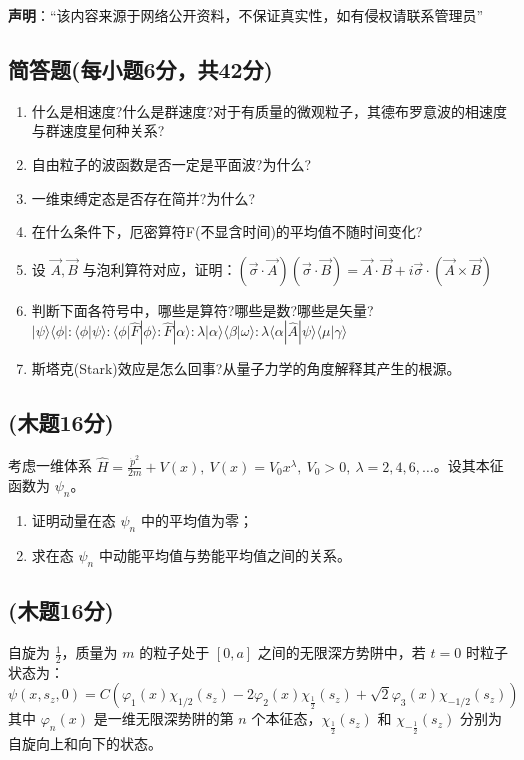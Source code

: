 
\textbf{声明}：“该内容来源于网络公开资料，不保证真实性，如有侵权请联系管理员”

\subsection{简答题(每小题6分，共42分)}
\begin{enumerate}
\item 什么是相速度?什么是群速度?对于有质量的微观粒子，其德布罗意波的相速度与群速度星何种关系?
\item 自由粒子的波函数是否一定是平面波?为什么?
\item 一维束缚定态是否存在简并?为什么?
\item 在什么条件下，厄密算符F(不显含时间)的平均值不随时间变化?
\item 设 $\vec{A}, \vec{B}$ 与泡利算符对应，证明：$\left( \vec{\sigma} \cdot \vec{A} \right) \left( \vec{\sigma} \cdot \vec{B} \right) = \vec{A} \cdot \vec{B} + i \vec{\sigma} \cdot \left( \vec{A} \times \vec{B} \right)$
\item 判断下面各符号中，哪些是算符?哪些是数?哪些是矢量?
$|\psi\rangle\langle\phi| : \langle\phi|\psi\rangle : \langle\phi|\hat{F}|\phi\rangle : \hat{F}|\alpha\rangle : \lambda |\alpha\rangle\langle\beta|\omega\rangle : \lambda \langle\alpha|\hat{A}|\psi\rangle\langle\mu|\gamma\rangle$
\item 斯塔克(Stark)效应是怎么回事?从量子力学的角度解释其产生的根源。
\end{enumerate}
\subsection{(木题16分)}
考虑一维体系 $\hat H = \frac{\dot p^2}{2m} + V(x),\ V(x) = V_0 x^\lambda,\ V_0 > 0,\ \lambda = 2, 4, 6, \ldots$。设其本征函数为 $\psi_n$。
\begin{enumerate}
\item 证明动量在态 $\psi_n$ 中的平均值为零；
\item 求在态 $\psi_n$ 中动能平均值与势能平均值之间的关系。
\end{enumerate}
\subsection{(木题16分)}
自旋为 $\frac{1}{2}$，质量为 $m$ 的粒子处于 $[0,a]$ 之间的无限深方势阱中，若 $t = 0$ 时粒子状态为：
$$\psi(x,s_z,0) = C \left( \varphi_1(x) \chi_{1/2}(s_z) - 2 \varphi_2(x) \chi_{\frac{1}{2}}(s_z) + \sqrt{2} \varphi_3(x) \chi_{-1/2}(s_z) \right)~$$
其中 $\varphi_n(x)$ 是一维无限深势阱的第 $n$ 个本征态，$\chi_{\frac{1}{2}}(s_z)$ 和 $\chi_{-\frac{1}{2}}(s_z)$ 分别为自旋向上和向下的状态。